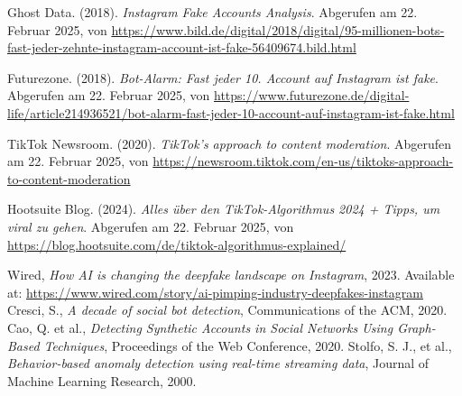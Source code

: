 \documentclass[12pt]{report}
\begin{document}
\begin{thebibliography}{9}
	
	 Ghost Data. (2018). \textit{Instagram Fake Accounts Analysis}. Abgerufen am 22. Februar 2025, von \url{https://www.bild.de/digital/2018/digital/95-millionen-bots-fast-jeder-zehnte-instagram-account-ist-fake-56409674.bild.html}
	
	 Futurezone. (2018). \textit{Bot-Alarm: Fast jeder 10. Account auf Instagram ist fake}. Abgerufen am 22. Februar 2025, von \url{https://www.futurezone.de/digital-life/article214936521/bot-alarm-fast-jeder-10-account-auf-instagram-ist-fake.html}
	
	 TikTok Newsroom. (2020). \textit{TikTok's approach to content moderation}. Abgerufen am 22. Februar 2025, von \url{https://newsroom.tiktok.com/en-us/tiktoks-approach-to-content-moderation}
	
	 Hootsuite Blog. (2024). \textit{Alles über den TikTok-Algorithmus 2024 + Tipps, um viral zu gehen}. Abgerufen am 22. Februar 2025, von \url{https://blog.hootsuite.com/de/tiktok-algorithmus-explained/}
	
	 Wired, \textit{How AI is changing the deepfake landscape on Instagram}, 2023. Available at: \url{https://www.wired.com/story/ai-pimping-industry-deepfakes-instagram}
	 Cresci, S., \textit{A decade of social bot detection}, Communications of the ACM, 2020.
	 Cao, Q. et al., \textit{Detecting Synthetic Accounts in Social Networks Using Graph-Based Techniques}, Proceedings of the Web Conference, 2020.
	 Stolfo, S. J., et al., \textit{Behavior-based anomaly detection using real-time streaming data}, Journal of Machine Learning Research, 2000.
	
\end{thebibliography}
\end{document}

